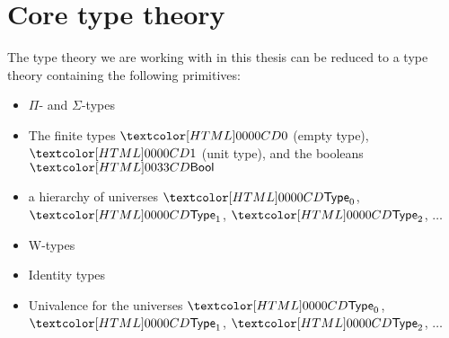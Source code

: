 \section{Core type theory}

The type theory we are working with in this thesis can be reduced to a
type theory containing the following primitives:
%
\begin{itemize}
\item $\Pi$- and $\Sigma$-types
\item The finite types $\emptyty$ (empty type), $\unitty$ (unit type),
  and the booleans $\boolty$
\item a hierarchy of universes $\Type_0$, $\Type_1$, $\Type_2$, $\hdots$
\item W-types
\item Identity types
\item Univalence for the universes $\Type_0$, $\Type_1$, $\Type_2$, $\hdots$
\end{itemize}
%
